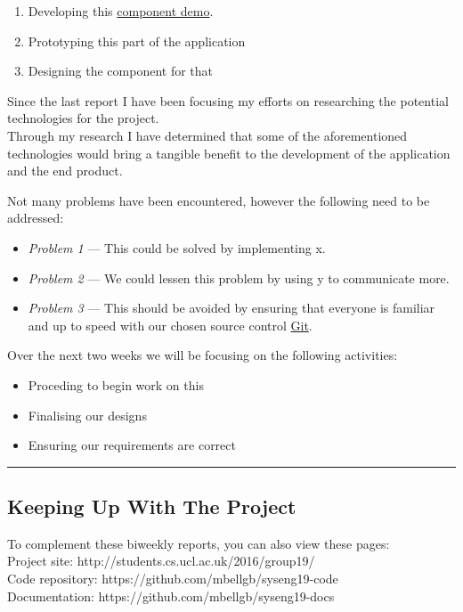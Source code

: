 \documentclass[11pt]{report}
\begin{document}
\begin{enumerate}
  \item Developing this \href{http://google.com}{component demo}.
  \item Prototyping this part of the application
  \item Designing the component for that
\end{enumerate}

\pagebreak
\bigskip
{}
\smallskip

\noindent
Since the last report I have been focusing my efforts on researching the potential technologies for the project. \\

\noindent
Through my research I have determined that some of the aforementioned technologies would bring a tangible benefit to the development of the application and the end product. \\

\bigskip
{}
\smallskip

\noindent
Not many problems have been encountered, however the following need to be addressed:

\begin{itemize}
  \item {\it Problem 1\/} --- This could be solved by implementing x.
  \item {\it Problem 2\/} --- We could lessen this problem by using y to communicate more.
  \item {\it Problem 3\/} --- This should be avoided by ensuring that everyone is familiar and up to speed with our chosen source control \href{http://git-scm.com}{Git}.
\end{itemize}

\bigskip
{}
\smallskip

\noindent
Over the next two weeks we will be focusing on the following activities:

\begin{itemize}
  \item Proceding to begin work on this
  \item Finalising our designs
  \item Ensuring our requirements are correct
\end{itemize}

\hrule

\subsection*{Keeping Up With The Project}

To complement these biweekly reports, you can also view these pages:\\

\noindent
Project site: http://students.cs.ucl.ac.uk/2016/group19/\\

\noindent
Code repository: https://github.com/mbellgb/syseng19-code\\

\noindent
Documentation: https://github.com/mbellgb/syseng19-docs
\end{document}

